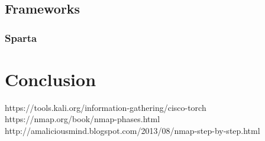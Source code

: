 \documentclass[journal]{IEEEtran}
\begin{document}
\subsection{Frameworks}
\subsubsection{Sparta}

\section{Conclusion}



\begin{thebibliography}{1}

https://tools.kali.org/information-gathering/cisco-torch
https://nmap.org/book/nmap-phases.html
http://amaliciousmind.blogspot.com/2013/08/nmap-step-by-step.html


\end{thebibliography}
\end{document}
